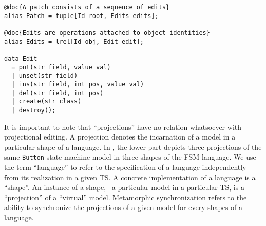 \begin{lstlisting}[label=lst:delta-adt, caption={CRUD-like \ds structure definition in Rascal}, language=Rascal]
@doc{A patch consists of a sequence of edits}
alias Patch = tuple[Id root, Edits edits];

@doc{Edits are operations attached to object identities}
alias Edits = lrel[Id obj, Edit edit];

data Edit
  = put(str field, value val)
  | unset(str field)
  | ins(str field, int pos, value val)
  | del(str field, int pos)
  | create(str class) 
  | destroy();
\end{lstlisting}

It is important to note that ``projections'' have no relation whatsoever with projectional editing.
A projection denotes the incarnation of a model in a particular shape of a language.
In , the lower part depicts three projections of the same \texttt{Button} state machine model in three shapes of the FSM language.
We use the term ``language'' to refer to the specification of a language independently from its realization in a given TS.
A concrete implementation of a language is a ``shape''.
An instance of a shape, \ie~a particular model in a particular TS, is a ``projection'' of a ``virtual'' model.
Metamorphic synchronization refers to the ability to synchronize the projections of a given model for every shapes of a language.



